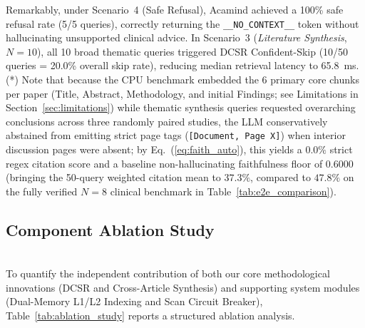 \documentclass[10pt]{SPIIRAS_Proceedings}
\begin{document}
Remarkably, under Scenario~4 (Safe Refusal), Acamind achieved a 100\% safe refusal rate (5/5 queries), correctly returning the \texttt{\_\_NO\_CONTEXT\_\_} token \cite{yan2024corrective} without hallucinating unsupported clinical advice. In Scenario~3 (\textit{Literature Synthesis}, $N=10$), all 10 broad thematic queries triggered DCSR Confident-Skip (10/50 queries = 20.0\% overall skip rate), reducing median retrieval latency to 65.8~ms. (*) Note that because the CPU benchmark embedded the 6 primary core chunks per paper (Title, Abstract, Methodology, and initial Findings; see Limitations in Section~\ref{sec:limitations}) while thematic synthesis queries requested overarching conclusions across three randomly paired studies, the LLM conservatively abstained from emitting strict page tags (\texttt{[Document, Page X]}) when interior discussion pages were absent; by Eq.~(\ref{eq:faith_auto}), this yields a $0.0\%$ strict regex citation score and a baseline non-hallucinating faithfulness floor of $0.6000$ (bringing the 50-query weighted citation mean to $37.3\%$, compared to $47.8\%$ on the fully verified $N=8$ clinical benchmark in Table~\ref{tab:e2e_comparison}).

\subsection{Component Ablation Study}~\\
\hspace*{\parindent}To quantify the independent contribution of both our core methodological innovations (DCSR and Cross-Article Synthesis) and supporting system modules (Dual-Memory L1/L2 Indexing and Scan Circuit Breaker), Table~\ref{tab:ablation_study} reports a structured ablation analysis.
\end{document}
